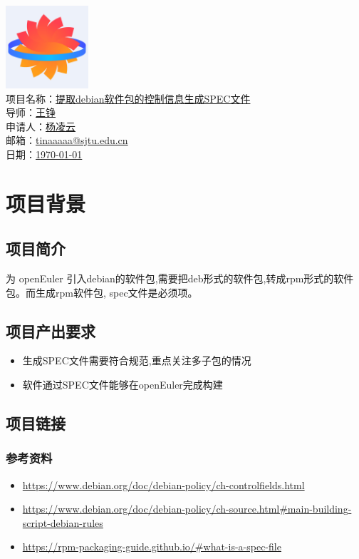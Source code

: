\documentclass{article}
\begin{document}
\begin{center}
    \includegraphics[width=0.23\textwidth]{logo.png} \\
    项目名称：\underline{提取debian软件包的控制信息生成SPEC文件} \\
    导师：\underline{王铮}  \\
    申请人：\underline{杨凌云} \\
    邮箱：\underline{tinaaaaa@sjtu.edu.cn} \\
    日期：\underline{\today}
\end{center}
\tableofcontents
\newpage

\section{项目背景}
\subsection{项目简介}
为 openEuler 引入debian的软件包,需要把deb形式的软件包,转成rpm形式的软件包。而生成rpm软件包, spec文件是必须项。

\subsection{项目产出要求}
\begin{itemize}
    \item 生成SPEC文件需要符合规范,重点关注多子包的情况
    \item 软件通过SPEC文件能够在openEuler完成构建
\end{itemize}

\subsection{项目链接}
\subsubsection{参考资料}
\begin{itemize}
    \item \href{https://www.debian.org/doc/debian-policy/ch-controlfields.html}
    {https://www.debian.org/doc/debian-policy/ch-controlfields.html}
    \item \href{https://www.debian.org/doc/debian-policy/ch-source.html\#main-building-script-debian-rules}
    {https://www.debian.org/doc/debian-policy/ch-source.html\#main-building-script-debian-rules}
    \item \href{https://rpm-packaging-guide.github.io/\#what-is-a-spec-file}
    {https://rpm-packaging-guide.github.io/\#what-is-a-spec-file}
\end{itemize}
\end{document}
